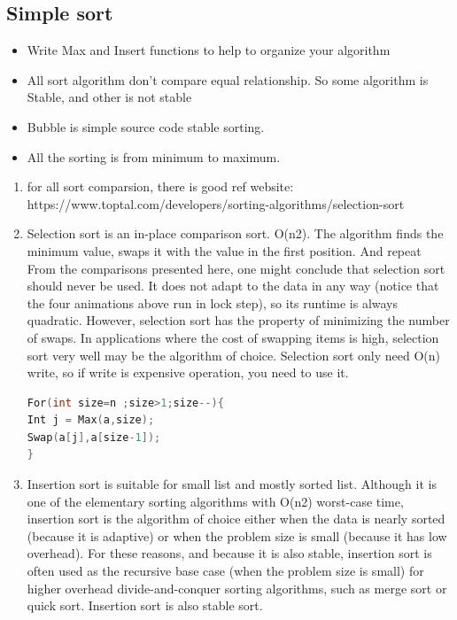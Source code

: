 \documentclass[a4paper,11pt,twoside]{book}
\begin{document}
\subsection{Simple sort}
\begin{itemize}
	\item Write Max and Insert functions to help to organize your algorithm
	\item All sort algorithm don't compare equal relationship. So some algorithm is Stable, and other is not stable
	\item Bubble is simple source code stable sorting. 
	\item All the sorting is from minimum to maximum.
\end{itemize}
 
\begin{enumerate}
	\item for all sort comparsion, there is good ref website: https://www.toptal.com/developers/sorting-algorithms/selection-sort

	\item Selection sort is an in-place comparison sort. O(n2). The algorithm finds the minimum value, swaps it with the value in the first position.  And repeat From the comparisons presented here, one might conclude that selection sort should never be used. It does not adapt to the data in any way (notice that the four animations above run in lock step), so its runtime is always quadratic. However, selection sort has the property of minimizing the number of swaps. In applications where the cost of swapping items is high, selection sort very well may be the algorithm of choice. Selection sort only need O(n) write, so if write is expensive operation, you need to use it. 
\begin{lstlisting}[frame=single, language=c++]
For(int size=n ;size>1;size--){
Int j = Max(a,size);
Swap(a[j],a[size-1]);
}
\end{lstlisting}

	\item Insertion sort is suitable for small list and mostly sorted list. Although it is one of the elementary sorting algorithms with O(n2) worst-case time, insertion sort is the algorithm of choice either when the data is nearly sorted (because it is adaptive) or when the problem size is small (because it has low overhead). For these reasons, and because it is also stable, insertion sort is often used as the recursive base case (when the problem size is small) for higher overhead divide-and-conquer sorting algorithms, such as merge sort or quick sort. Insertion sort is also stable sort. 


\end{enumerate}
\end{document}
